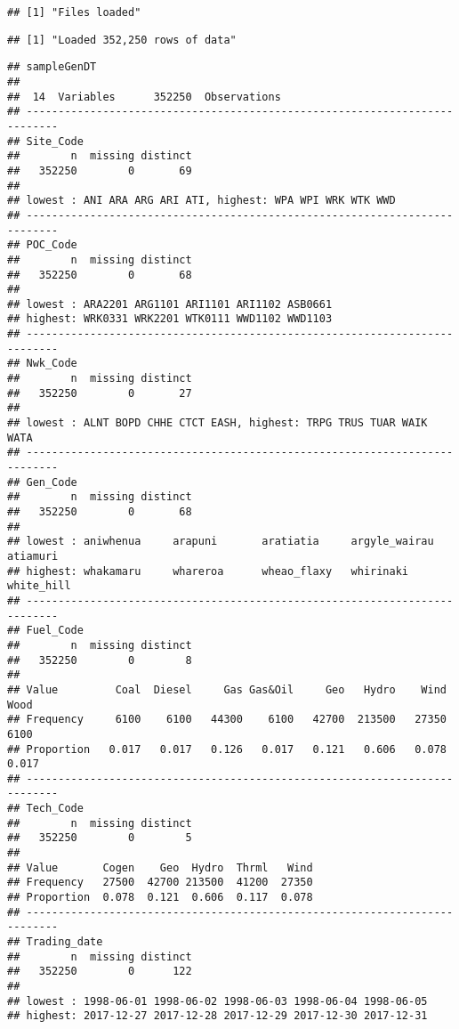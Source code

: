 \documentclass[]{article}
\theoremstyle{definition}
\theoremstyle{definition}
\theoremstyle{definition}
\theoremstyle{remark}
\begin{document}
\begin{verbatim}
## [1] "Files loaded"
\end{verbatim}

\begin{verbatim}
## [1] "Loaded 352,250 rows of data"
\end{verbatim}

\begin{verbatim}
## sampleGenDT 
## 
##  14  Variables      352250  Observations
## ---------------------------------------------------------------------------
## Site_Code 
##        n  missing distinct 
##   352250        0       69 
## 
## lowest : ANI ARA ARG ARI ATI, highest: WPA WPI WRK WTK WWD
## ---------------------------------------------------------------------------
## POC_Code 
##        n  missing distinct 
##   352250        0       68 
## 
## lowest : ARA2201 ARG1101 ARI1101 ARI1102 ASB0661
## highest: WRK0331 WRK2201 WTK0111 WWD1102 WWD1103
## ---------------------------------------------------------------------------
## Nwk_Code 
##        n  missing distinct 
##   352250        0       27 
## 
## lowest : ALNT BOPD CHHE CTCT EASH, highest: TRPG TRUS TUAR WAIK WATA
## ---------------------------------------------------------------------------
## Gen_Code 
##        n  missing distinct 
##   352250        0       68 
## 
## lowest : aniwhenua     arapuni       aratiatia     argyle_wairau atiamuri     
## highest: whakamaru     whareroa      wheao_flaxy   whirinaki     white_hill   
## ---------------------------------------------------------------------------
## Fuel_Code 
##        n  missing distinct 
##   352250        0        8 
##                                                                           
## Value         Coal  Diesel     Gas Gas&Oil     Geo   Hydro    Wind    Wood
## Frequency     6100    6100   44300    6100   42700  213500   27350    6100
## Proportion   0.017   0.017   0.126   0.017   0.121   0.606   0.078   0.017
## ---------------------------------------------------------------------------
## Tech_Code 
##        n  missing distinct 
##   352250        0        5 
##                                              
## Value       Cogen    Geo  Hydro  Thrml   Wind
## Frequency   27500  42700 213500  41200  27350
## Proportion  0.078  0.121  0.606  0.117  0.078
## ---------------------------------------------------------------------------
## Trading_date 
##        n  missing distinct 
##   352250        0      122 
## 
## lowest : 1998-06-01 1998-06-02 1998-06-03 1998-06-04 1998-06-05
## highest: 2017-12-27 2017-12-28 2017-12-29 2017-12-30 2017-12-31

\end{verbatim}
\end{document}
